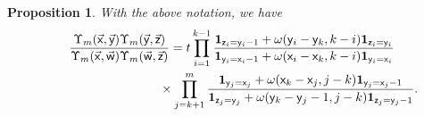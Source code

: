 \documentclass[pdftex]{sigma}
\numberwithin{equation}{section}
\newtheorem{Proposition}[Theorem]{Proposition}
{ \theoremstyle{definition}
\newtheorem{Definition}[Theorem]{Definition}}
\begin{document}
\begin{Proposition}\label{prop:Boltzmann_factor}\samepage
	With the above notation, we have
	\begin{gather}
			\frac{
				\Upsilon_m(\vec{\mathsf{x}},\vec{\mathsf{y}})
				\Upsilon_m(\vec{\mathsf{y}},\vec{\mathsf{z}})
			}
			{
				\Upsilon_m(\vec{\mathsf{x}},\vec{\mathsf{w}})
				\Upsilon_m(\vec{\mathsf{w}},\vec{\mathsf{z}})
			}
			 =
			t
			\prod_{i=1}^{k-1}
			\frac{
				\mathbf{1}_{\mathsf{z}_i=\mathsf{y}_i-1} +
				\omega(\mathsf{y}_i-\mathsf{y}_k,
				k-i)\mathbf{1}_{\mathsf{z}_i=\mathsf{y}_i}
			}
			{
				\mathbf{1}_{\mathsf{y}_i=\mathsf{x}_i-1}
				+
				\omega(\mathsf{x}_i-\mathsf{x}_k,k-i)
				\mathbf{1}_{\mathsf{y}_i=\mathsf{x}_i}
			}
			\nonumber\\
\hphantom{\frac{
				\Upsilon_m(\vec{\mathsf{x}},\vec{\mathsf{y}})
				\Upsilon_m(\vec{\mathsf{y}},\vec{\mathsf{z}})
			}
			{
				\Upsilon_m(\vec{\mathsf{x}},\vec{\mathsf{w}})
				\Upsilon_m(\vec{\mathsf{w}},\vec{\mathsf{z}})
			}
			 =}{}
			\times
			\prod_{j=k+1}^{m}
			\frac{
				\mathbf{1}_{\mathsf{y}_j=\mathsf{x}_j}
				+
				\omega(\mathsf{x}_k-\mathsf{x}_j,j-k)
				\mathbf{1}_{\mathsf{y}_j=\mathsf{x}_j-1}
			}
			{
				\mathbf{1}_{\mathsf{z}_j=\mathsf{y}_j}
				+
				\omega(\mathsf{y}_k-\mathsf{y}_j-1,j-k)
				\mathbf{1}_{\mathsf{z}_j=\mathsf{y}_j-1}
			}.\label{eq:Boltzmann_factor}
		\end{gather}
\end{Proposition}
\end{document}
